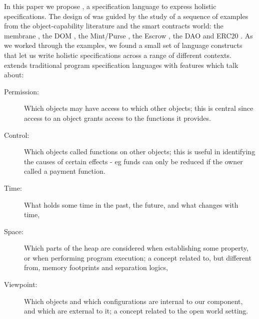 In this paper we propose \Chainmail, a specification language to
express holistic specifications.
The design of \Chainmail was guided by the study of a sequence of
examples from the object-capability literature and the smart contracts world: the
membrane \cite{membranesJavascript}, the DOM \cite{dd,ddd}, the Mint/Purse \cite{MillerPhD}, the Escrow \cite{proxiesECOOP2013}, the DAO \cite{Dao,DaoBug} and
ERC20 \cite{ERC20}.  As we worked through the
examples, we found a small set of language constructs that let us
write holistic specifications across a range of different contexts.
%
\Chainmail extends 
traditional program specification languages \cite{Leavens-etal07,Meyer92} with features which talk about:
%
\begin{description}
\item[Permission: ] 
Which objects may have access to which other objects; 
this is central since access to an object grants access to the functions it provides.
%
\item[Control: ]
Which objects called functions on other objects; this
 is useful in identifying the causes of certain effects - eg 
funds can only be reduced if the owner called a payment function.
%
%
\item[Time: ]
What holds some time in  the past, the future, and what changes with time,
\item[Space: ]
Which parts of the heap are considered when establishing some property, or when 
performing program execution; a concept
related to, but different from, memory footprints and separation logics,
\item[Viewpoint: ]
Which objects and which configurations are internal to our component, and which  are
external to it;
a concept related to the open world setting.
\end{description}

